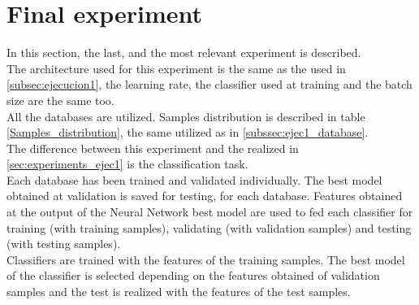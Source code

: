 \section{Final experiment}\label{sec:Final_archi} %
In this section, the last, and the most relevant experiment is described.\\

The architecture used for this experiment is the same as the used in \ref{subsec:ejecucion1}, the learning rate, the classifier used at training and the batch size are the same too.\\

All the databases are utilized. Samples distribution  is described in table \ref{Samples_distribution}, the same utilized as in \ref{subssec:ejec1_database}.\\

The difference between this experiment and the realized in \ref{sec:experiments_ejec1} is the classification task.\\

Each database has been trained and validated individually. The best model obtained at validation is saved for testing, for each database. Features obtained at the output of the Neural Network best model are used to fed each classifier for training (with training samples), validating (with validation samples) and testing (with testing samples).\\

Classifiers are trained with the features of the training samples. The best model of the classifier is selected depending on the features obtained of validation samples and the test is realized with the features of the test samples.\\



